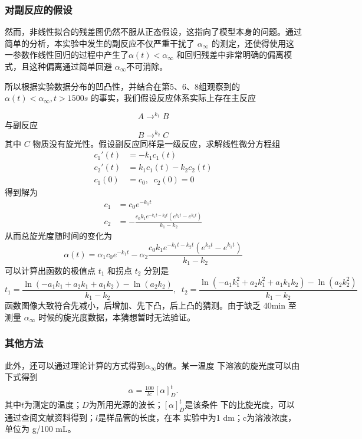 \documentclass[12pt]{ctexart}
\numberwithin{equation}{section}
\begin{document}
\subsubsection{对副反应的假设}

然而，非线性拟合的残差图仍然不服从正态假设，这指向了模型本身的问题。通过简单的分析，本实验中发生的副反应不仅严重干扰了 $\alpha_{\infty}$ 的测定，还使得使用这一参数作线性回归的过程中产生了$\alpha(t)<\alpha_{\infty}$ 和回归残差中非常明确的偏离模式，且这种偏离通过简单回避 $\alpha_{\infty}$不可消除。

所以根据实验数据分布的凹凸性，并结合在第5、6、8组观察到的 $\alpha(t)<\alpha_{\infty}, t>1500s$ 的事实，我们假设反应体系实际上存在主反应

\[
    A \mathop{\longrightarrow}^{k_1} B
\]
与副反应
\[
    B \mathop{\longrightarrow}^{k_2} C
\]
其中 $C$ 物质没有旋光性。假设副反应同样是一级反应，求解线性微分方程组
\begin{align*}
        c_1'(t)&=-k_1 c_1(t) \\
        c_2'(t)&=k_1 c_1(t)-k_2 c_2(t) \\
        c_1(0)&=c_0 ,\;\;
        c_2(0)=0
\end{align*}
得到解为
\begin{align*}
        c_1 &= c_0 e^{-k_1 t} \\
        c_2 &= -\frac{c_0 k_1 e^{-k_1 t-k_2 t}
        \left(e^{k_2 t}-e^{k_1 t}\right)}{k_1-k_2}
\end{align*}
从而总旋光度随时间的变化为
\[
    \alpha(t) = \alpha_1 c_0 e^{-k_1 t} - \alpha_2 \frac{c_0 k_1 e^{-k_1 t-k_2 t}
    \left(e^{k_2 t}-e^{k_1 t}\right)}{k_1-k_2}
\]
可以计算出函数的极值点 $t_1$ 和拐点 $t_2$ 分别是
\[
    t_1 = \frac{\ln \left(-a_1 k_1+a_2 k_1+a_1k_2\right)-\ln (a_2 k_2)}{k_1-k_2},\;\;
   t_2 = \frac{\ln \left(-a_1 k_1^2+a_2 k_1^2+a_1k_1k_2\right)-\ln (a_2 k_2^2)}{k_1-k_2}
\]
函数图像大致符合先减小，后增加、先下凸，后上凸的猜测。由于缺乏 40min 至 测量 $\alpha_{\infty}$ 时候的旋光度数据，本猜想暂时无法验证。 

\subsubsection{其他方法}
此外，还可以通过理论计算的方式得到$\alpha_\infty$的值。某一温度
下溶液的旋光度可以由下式得到
\begin{align}
    \alpha = \frac{100}{lc}[\alpha]_D^t.
\end{align}
其中$t$为测定的温度；$D$为所用光源的波长；$[\alpha]_D^t$是该条件
下的比旋光度，可以通过查阅文献资料得到；$l$是样品管的长度，在本
实验中为1 dm；c为溶液浓度，单位为 g/100 mL。
\end{document}

